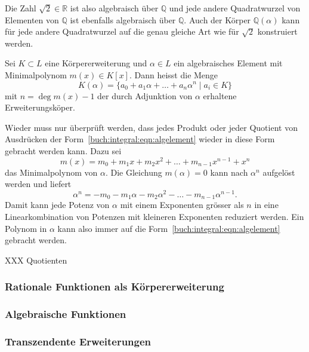 Die Zahl $\sqrt{2}\in\mathbb{R}$ ist also algebraisch über $\mathbb{Q}$
und jede andere Quadratwurzel von Elementen von $\mathbb{Q}$ ist
ebenfalls algebraisch über $\mathbb{Q}$.
Auch der Körper $\mathbb{Q}(\alpha)$ kann für jede andere Quadratwurzel
auf die genau gleiche Art wie für $\sqrt{2}$ konstruiert werden.

\begin{definition}
\label{buch:integral:definition:algebraischeerweiterung}
Sei $K\subset L$ eine Körpererweiterung und $\alpha\in L$ ein algebraisches
Element mit Minimalpolynom $m(x)\in K[x]$.
Dann heisst die Menge
\begin{equation}
K(\alpha)
=
\{
a_0 + a_1\alpha + \ldots +a_n\alpha^n
\;|\;
a_i\in K
\}
\label{buch:integral:eqn:algelement}
\end{equation}
mit $n=\deg m(x) - 1$ der durch Adjunktion von $\alpha$ erhaltene
Erweiterungsköper.
\end{definition}

Wieder muss nur überprüft werden, dass jedes Produkt oder jeder
Quotient von Ausdrücken der Form~\eqref{buch:integral:eqn:algelement}
wieder in diese Form gebracht werden kann.
Dazu sei
\[
m(x)
=
m_0+m_1x + m_2x^2
+\ldots +m_{n-1}x^{n-1} + x^n
\]
das Minimalpolynom von $\alpha$.
Die Gleichung $m(\alpha)=0$ kann nach $\alpha^n$ aufgelöst werden und
liefert
\[
\alpha^n = -m_0 - m_1\alpha - m_2\alpha^2 -\ldots -m_{n-1}\alpha^{n-1}.
\]
Damit kann jede Potenz von $\alpha$ mit einem Exponenten grösser als $n$
in eine Linearkombination von Potenzen mit kleineren Exponenten
reduziert werden.
Ein Polynom in $\alpha$ kann also immer auf die
Form~\eqref{buch:integral:eqn:algelement}
gebracht werden.

XXX Quotienten

\subsubsection{Rationale Funktionen als Körpererweiterung}

\subsubsection{Algebraische Funktionen}

\subsubsection{Transzendente Erweiterungen}


